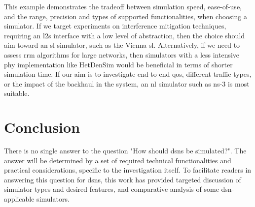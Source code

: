 \documentclass[conference]{IEEEtran}
\begin{document}
This example demonstrates the tradeoff between simulation speed, ease-of-use, and the range, precision and types of supported
functionalities, when choosing a simulator.
If we target experiments on interference mitigation techniques, requiring an \ac{l2s} interface with a low level of abstraction, then the choice should aim toward an \ac{sl} simulator, such as the Vienna \ac{sl}. Alternatively, if we need to assess \ac{rrm} algorithms for large networks, then simulators with a less intensive \ac{phy} implementation like HetDenSim would be beneficial in terms of shorter simulation time. If
our aim is to investigate end-to-end \ac{qos}, different traffic types, or the impact of the backhaul in the system, an \ac{nl} simulator such as ns-3 is most suitable.





\section{Conclusion} \label{sec:toward_5G}

There is no single answer to the question "How should \acp{dsn} be simulated?". The answer will be determined by a set of required technical functionalities and practical considerations, specific to the investigation itself. To facilitate readers in answering this question for \acp{dsn}, this work has provided targeted discussion of simulator types and desired features, and comparative analysis of some \ac{dsn}-applicable simulators. 
\end{document}
